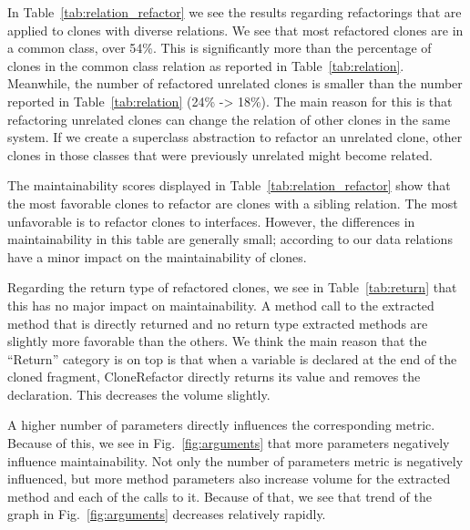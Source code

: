 In Table~\ref{tab:relation_refactor} we see the results regarding refactorings that are applied to clones with diverse relations. We see that most refactored clones are in a common class, over 54\%. This is significantly more than the percentage of clones in the common class relation as reported in Table~\ref{tab:relation}. Meanwhile, the number of refactored unrelated clones is smaller than the number reported in Table~\ref{tab:relation} (24\% -> 18\%). The main reason for this is that refactoring unrelated clones can change the relation of other clones in the same system. If we create a superclass abstraction to refactor an unrelated clone, other clones in those classes that were previously unrelated might become related.

The maintainability scores displayed in Table~\ref{tab:relation_refactor} show that the most favorable clones to refactor are clones with a sibling relation. The most unfavorable is to refactor clones to interfaces. However, the differences in maintainability in this table are generally small; according to our data relations have a minor impact on the maintainability of clones.

Regarding the return type of refactored clones, we see in Table~\ref{tab:return} that this has no major impact on maintainability. A method call to the extracted method that is directly returned and no return type extracted methods are slightly more favorable than the others. We think the main reason that the ``Return'' category is on top is that when a variable is declared at the end of the cloned fragment, CloneRefactor directly returns its value and removes the declaration. This decreases the volume slightly.

A higher number of parameters directly influences the corresponding metric. Because of this, we see in Fig.~\ref{fig:arguments} that more parameters negatively influence maintainability. Not only the number of parameters metric is negatively influenced, but more method parameters also increase volume for the extracted method and each of the calls to it. Because of that, we see that trend of the graph in Fig.~\ref{fig:arguments} decreases relatively rapidly.
